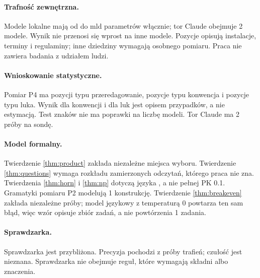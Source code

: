 \paragraph{Trafność zewnętrzna.}
Modele lokalne mają od \pkLocalParamMin{} do \pkLocalParamMax{} mld parametrów włącznie; tor Claude
obejmuje 2 modele.
Wynik nie przenosi się wprost na inne modele. Pozycje opisują instalacje, terminy
i regulaminy; inne dziedziny wymagają osobnego pomiaru. Praca nie zawiera badania
z udziałem ludzi.

\paragraph{Wnioskowanie statystyczne.}
Pomiar P4 ma \pkItemsRewrite{} pozycji typu przeredagowanie, \pkItemsConv{} pozycje typu
konwencja i \pkItemsGap{} pozycje typu luka. Wynik dla konwencji i dla luk jest opisem
przypadków, a nie estymacją. Test znaków nie ma poprawki na liczbę modeli. Tor Claude
ma 2 próby na sondę.

\paragraph{Model formalny.}
Twierdzenie \ref{thm:product} zakłada niezależne miejsca wyboru. Twierdzenie
\ref{thm:questions} wymaga rozkładu zamierzonych odczytań, którego praca nie zna.
Twierdzenia \ref{thm:horn} i \ref{thm:np} dotyczą języka \PKz, a nie pełnej PK 0.1.
Gramatyki pomiaru P2 modelują 1 konstrukcję. Twierdzenie \ref{thm:breakeven} zakłada
niezależne próby; model językowy z temperaturą 0 powtarza ten sam błąd, więc wzór
opisuje zbiór zadań, a nie powtórzenia 1 zadania.

\paragraph{Sprawdzarka.}
Sprawdzarka jest przybliżona. Precyzja pochodzi z próby \pkPrecN{} trafień; czułość jest
nieznana. Sprawdzarka nie obejmuje reguł, które wymagają składni albo znaczenia.
